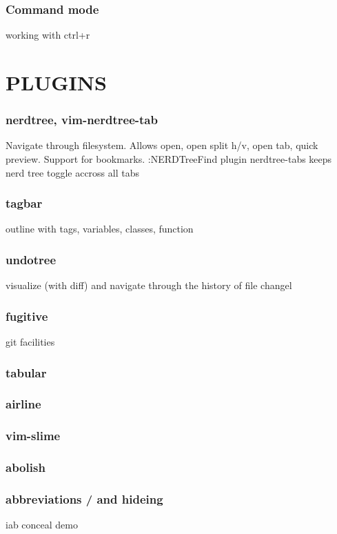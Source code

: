 \documentclass{beamer}
\begin{document}
\begin{frame}
  \frametitle{Command mode}
  working with ctrl+r
\end{frame}


\section{PLUGINS}
\begin{frame}
  \frametitle{nerdtree, vim-nerdtree-tab}
  Navigate through filesystem.
  Allows open, open split h/v, open tab, quick preview.
  Support for bookmarks.
  :NERDTreeFind
  plugin nerdtree-tabs keeps nerd tree toggle accross all tabs
\end{frame}

\begin{frame}
  \frametitle{tagbar}
  outline with tags, variables, classes, function
\end{frame}

\begin{frame}
  \frametitle{undotree}
  visualize (with diff) and navigate through the history of file changel
\end{frame}

\begin{frame}
  \frametitle{fugitive}
  git facilities
\end{frame}

\begin{frame}
  \frametitle{tabular}

\end{frame}

\begin{frame}
  \frametitle{airline}
\end{frame}

\begin{frame}
  \frametitle{vim-slime}
\end{frame}


\begin{frame}
  \frametitle{abolish}
\end{frame}

\begin{frame}
  \frametitle{abbreviations / and hideing}
      iab
      conceal demo
\end{frame}
\end{document}
